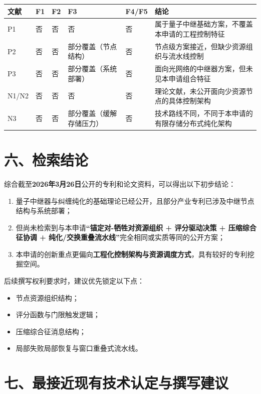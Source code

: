 \documentclass[12pt,a4paper]{article}
\begin{document}
\renewcommand{\arraystretch}{1.3}
\small
\setlength{\tabcolsep}{4pt}
\begin{tabularx}{\textwidth}{|L{1.4cm}|L{2.1cm}|L{2.1cm}|L{2.1cm}|L{2.1cm}|X|}
\hline
\textbf{文献} & \textbf{F1} & \textbf{F2} & \textbf{F3} & \textbf{F4/F5} & \textbf{结论} \\
\hline
P1 & 否 & 否 & 否 & 否 & 属于量子中继基础方案，不覆盖本申请的工程控制特征 \\
\hline
P2 & 否 & 否 & 部分覆盖（节点结构） & 否 & 节点级方案接近，但缺少资源组织与流水线控制 \\
\hline
P3 & 否 & 否 & 部分覆盖（系统部署） & 否 & 面向光网络的中继器方案，但未见本申请组合特征 \\
\hline
N1/N2 & 否 & 否 & 否 & 否 & 理论文献，未公开面向少资源节点的具体控制架构 \\
\hline
N3 & 否 & 否 & 部分覆盖（缓解存储压力） & 否 & 技术路线不同，不同于本申请的有限存储分布式纯化架构 \\
\hline
\end{tabularx}
\normalsize
\setlength{\tabcolsep}{6pt}

\section*{六、检索结论}

综合截至\textbf{2026年3月26日}公开的专利和论文资料，可以得出以下初步结论：
\begin{enumerate}[label=(\arabic*)]
    \item 量子中继器与纠缠纯化的基础理论已经公开，且部分产业专利已涉及中继节点结构与系统部署；
    \item 但尚未检索到与本申请\textbf{“锚定对-牺牲对资源组织 + 评分驱动决策 + 压缩综合征协调 + 纯化/交换重叠流水线”}完全相同或实质等同的公开方案；
    \item 本申请的创新重点更偏向\textbf{工程化控制架构与资源调度方式}，具有较好的专利挖掘空间。
\end{enumerate}

后续撰写权利要求时，建议优先锁定以下点：
\begin{itemize}[leftmargin=2em]
    \item 节点资源组织结构；
    \item 评分函数与门限触发逻辑；
    \item 压缩综合征消息结构；
    \item 局部失败局部恢复与窗口重叠式流水线。
\end{itemize}

\section*{七、最接近现有技术认定与撰写建议}
\end{document}
